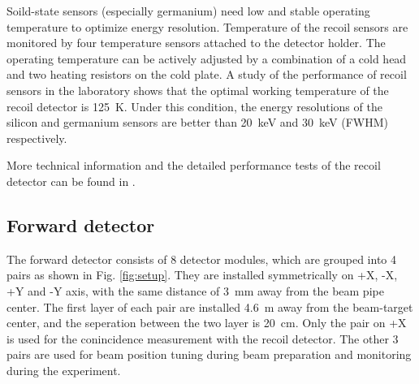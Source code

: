 \documentclass[number,5p]{elsarticle}
\begin{document}
Soild-state sensors (especially germanium) need low and stable operating temperature to optimize energy
resolution.
Temperature of the recoil sensors are monitored by four temperature sensors
attached to the detector holder.
The operating temperature can be actively adjusted by a combination of a cold head and two heating resistors on the cold plate.
A study of the performance of recoil sensors in the laboratory shows that the
optimal working temperature of the recoil detector is \SI{125}{\kelvin}.
Under this condition, the energy resolutions of the silicon and germanium
sensors are better than \SI{20}{\keV} and \SI{30}{\keV} (FWHM) respectively.

More technical information and the detailed performance tests of the recoil detector can be found in \cite{recoil_article}.

\subsection{Forward detector}
\label{sec:fwd}


The forward detector consists of 8 detector modules, which are
grouped into 4 pairs as shown in Fig. \ref{fig:setup}.
They are installed symmetrically on +X, -X, +Y and -Y axis, with the same
distance of \SI{3}{\mm} away from the beam pipe center.
The first layer of each pair are installed \SI{4.6}{\meter} away from the
beam-target center, and the seperation between the two layer is \SI{20}{\cm}.
Only the pair on +X is used for the conincidence measurement with the recoil detector.
The other 3 pairs are used for beam position tuning during beam preparation and
monitoring during the experiment.
\end{document}
